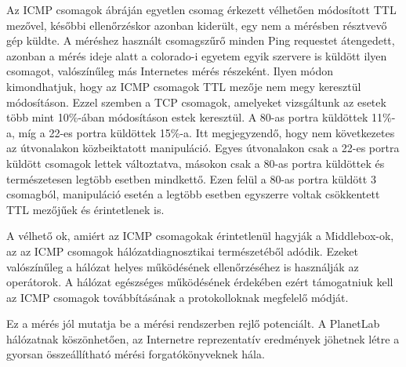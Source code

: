 Az ICMP csomagok ábráján egyetlen csomag érkezett vélhetően módosított TTL mezővel, későbbi ellenőrzéskor azonban kiderült, egy nem a mérésben résztvevő gép küldte. A méréshez használt csomagszűrő minden Ping requestet átengedett, azonban a mérés ideje alatt a colorado-i egyetem egyik szervere is küldött ilyen csomagot, valószínűleg más Internetes mérés részeként. Ilyen módon kimondhatjuk, hogy az ICMP csomagok TTL mezője nem megy keresztül módosításon. Ezzel szemben a TCP csomagok, amelyeket vizsgáltunk az esetek több mint 10\%-ában módosításon estek keresztül. A 80-as portra küldöttek 11\%-a, míg a 22-es portra küldöttek 15\%-a. Itt megjegyzendő, hogy nem következetes az útvonalakon közbeiktatott manipuláció. Egyes útvonalakon csak a 22-es portra küldött csomagok lettek változtatva, másokon csak a 80-as portra küldöttek és természetesen legtöbb esetben mindkettő. Ezen felül a 80-as portra küldött 3 csomagból, manipuláció esetén a legtöbb esetben egyszerre voltak csökkentett TTL mezőjűek és érintetlenek is.

A vélhető ok, amiért az ICMP csomagokak érintetlenül hagyják a Middlebox-ok, az az ICMP csomagok hálózatdiagnosztikai természetéből adódik. Ezeket valószínűleg a hálózat helyes működésének ellenőrzéséhez is használják az operátorok. A hálózat egészséges működésének érdekében ezért támogatniuk kell az ICMP csomagok továbbításának a protokolloknak megfelelő módját.

Ez a mérés jól mutatja be a mérési rendszerben rejlő potenciált. A PlanetLab hálózatnak köszönhetően, az Internetre reprezentatív eredmények jöhetnek létre a gyorsan összeállítható mérési forgatókönyveknek hála.
